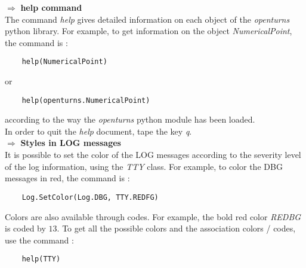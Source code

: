 \renewcommand{\filename}{docUC_Intro_GeneralCommands}
\renewcommand{\filetitle}{Some useful general commands}

\HeaderNNIILevel

$\boldsymbol{\Longrightarrow}$ {\bf help command}\\

The command {\itshape help} gives detailed information on each  object of the {\itshape openturns} python library. For example, to get information on the object {\itshape NumericalPoint}, the command is :
\begin{center}
  \begin{lstlisting}
    help(NumericalPoint)
  \end{lstlisting}
\end{center}
or
\begin{center}
  \begin{lstlisting}
    help(openturns.NumericalPoint)
  \end{lstlisting}
\end{center}
according to the way the  {\itshape openturns} python module has been loaded.\\
In order to quit the \emph{help} document, tape the key {\itshape q}.\\

$\boldsymbol{\Longrightarrow}$ {\bf Styles in LOG messages}\\

It is possible to set the color of the LOG messages according to the severity level of the log information,  using the \emph{TTY} class. For example, to color the DBG messages in red, the command is :
\begin{center}
  \begin{lstlisting}
    Log.SetColor(Log.DBG, TTY.REDFG)
  \end{lstlisting}
\end{center}

Colors are also available through codes. For example, the bold red color \textit{REDBG} is coded by $13$. To get all the possible colors and the association colors / codes, use the command :
\begin{center}
  \begin{lstlisting}
    help(TTY)
  \end{lstlisting}
\end{center}


